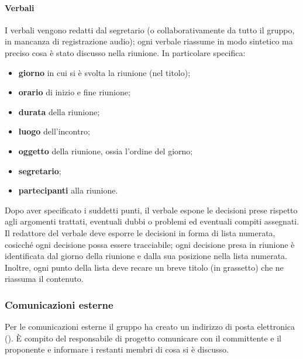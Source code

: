 \paragraph{Verbali} I verbali vengono redatti dal segretario (o collaborativamente da tutto il gruppo, in mancanza di registrazione audio); ogni verbale riassume in modo sintetico ma preciso cosa è stato discusso nella riunione. In particolare specifica:
\begin{itemize}
	\item \textbf{giorno} in cui si è svolta la riunione (nel titolo);
	\item \textbf{orario} di inizio e fine riunione;
	\item \textbf{durata} della riunione;
	\item \textbf{luogo} dell'incontro;
	\item \textbf{oggetto} della riunione, ossia l'ordine del giorno;
	\item \textbf{segretario};
	\item \textbf{partecipanti} alla riunione.
\end{itemize}
Dopo aver specificato i suddetti punti, il verbale espone le decisioni prese rispetto agli argomenti trattati, eventuali dubbi o problemi ed eventuali compiti assegnati. Il redattore del verbale deve esporre le decisioni in forma di lista numerata, cosicché ogni decisione possa essere tracciabile; ogni decisione presa in riunione è identificata dal giorno della riunione e dalla sua posizione nella lista numerata. Inoltre, ogni punto della lista deve recare un breve titolo (in grassetto) che ne riassuma il contenuto.


\subsubsection{Comunicazioni esterne}
Per le comunicazioni esterne il gruppo ha creato un indirizzo di posta elettronica (\email). È compito del responsabile di progetto comunicare con il committente e il proponente e informare i restanti membri di cosa si è discusso.


